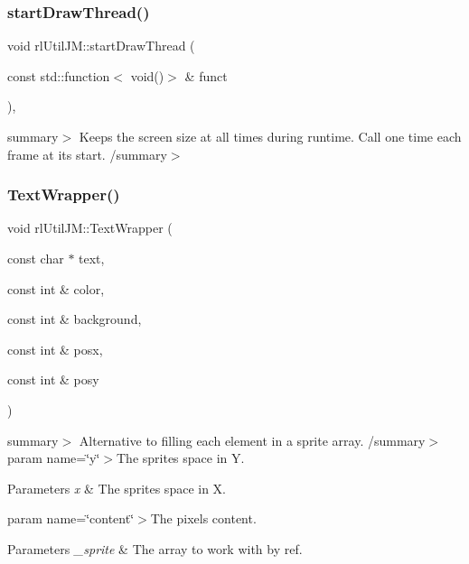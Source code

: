 \subsubsection{\texorpdfstring{start\+Draw\+Thread()}{startDrawThread()}}
{\footnotesize\ttfamily void rl\+Util\+J\+M\+::start\+Draw\+Thread (\begin{DoxyParamCaption}\item[{const std\+::function$<$ void()$>$ \&}]{funct }\end{DoxyParamCaption})\hspace{0.3cm}{\ttfamily [static]}, {\ttfamily [protected]}}

summary$>$ Keeps the screen size at all times during runtime. Call one time each frame at it\textquotesingle{}s start. /summary$>$ \mbox{\label{classrl_util_j_m_a43e3fa7db14af85ff8f5ed181951d594}} 
\subsubsection{\texorpdfstring{Text\+Wrapper()}{TextWrapper()}}
{\footnotesize\ttfamily void rl\+Util\+J\+M\+::\+Text\+Wrapper (\begin{DoxyParamCaption}\item[{const char $\ast$}]{text,  }\item[{const int \&}]{color,  }\item[{const int \&}]{background,  }\item[{const int \&}]{posx,  }\item[{const int \&}]{posy }\end{DoxyParamCaption})\hspace{0.3cm}{\ttfamily [static]}}

summary$>$ Alternative to filling each element in a sprite array. /summary$>$ param name=\char`\"{}y\char`\"{}$>$The sprite\textquotesingle{}s space in Y.


\begin{DoxyParams}{Parameters}
{\em x} & The sprite\textquotesingle{}s space in X.\\
\hline
\end{DoxyParams}
param name=\char`\"{}content\char`\"{}$>$The pixel\textquotesingle{}s content.


\begin{DoxyParams}{Parameters}
{\em \+\_\+sprite} & The array to work with by ref.\\
\hline
\end{DoxyParams}
\mbox{\label{classrl_util_j_m_a98c9c78f103e273f0279f6fea63a5cbf}} 
